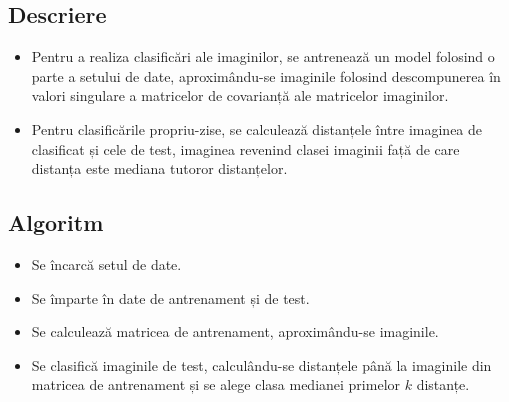 \documentclass{article}
\begin{document}
\subsection{Descriere}
\begin{itemize}
      \item Pentru a realiza clasificări ale imaginilor, se antrenează un model
            folosind o parte a setului de date, aproximându-se imaginile
            folosind descompunerea în valori singulare a matricelor de
            covarianță ale matricelor imaginilor.
      \item Pentru clasificările propriu-zise, se calculează distanțele între
            imaginea de clasificat și cele de test, imaginea revenind clasei
            imaginii față de care distanța este mediana tutoror distanțelor.
\end{itemize}

\subsection{Algoritm}
\begin{itemize}
      \item Se încarcă setul de date.
      \item Se împarte în date de antrenament și de test.
      \item Se calculează matricea de antrenament, aproximându-se imaginile.
      \item Se clasifică imaginile de test, calculându-se distanțele până la
            imaginile din matricea de antrenament și se alege clasa medianei
            primelor $k$ distanțe.
\end{itemize}
\end{document}
